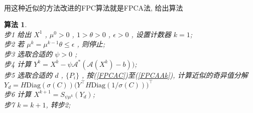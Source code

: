 \documentclass[a4paper, UTF8]{ctexart}				%
\newtheorem{algo}{\bf 算法}
\numberwithin{equation}{section}				%
\begin{document}
			\paragraph{}
				\quad 用这种近似的方法改进的FPC算法就是FPCA法, 给出算法
				\begin{algo}
					\quad\\
					步1 \quad 给出 $X^1$ , $\mu^0 > 0$ , $1 > \theta > 0$ , $\epsilon > 0$ , 设置计数器 $k = 1$;\\
					步2 \quad 若 $\mu^k = \mu^{k -1} \theta \le \epsilon$ , 则停止;\\
					步3 \quad 选取合适的 $\psi > 0$ ;\\
					步4 \quad 计算 $Y^k = X^k - \psi \mathcal{A}^*(\mathcal{A}(X^k) - b))$;\\
					步5 \quad 选取合适的 $d$ , $\{P_i\}$ , 按(\ref{FPCAC})至(\ref{FPCAAk}), 计算近似的奇异值分解 $Y_d = H \text{Diag}(\sigma(C)) \big(Y ^\top H \text{Diag}(1/\sigma(C))\big)^\top$\\
					步6 \quad 计算 $X^{k + 1} = S_{\psi \mu^k}(Y_d)$;\\
					步7 \quad $k = k + 1$, 转步2;
				\end{algo}
\end{document}
